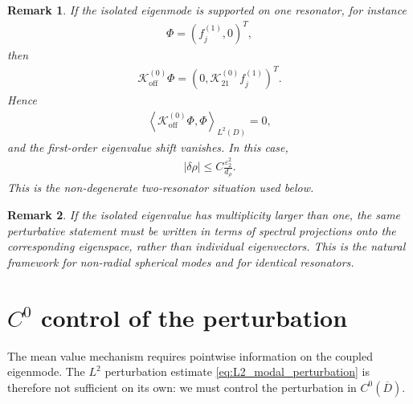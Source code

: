 \documentclass[10pt]{article}
\numberwithin{equation}{section}
\newtheorem*{remark}{Remark}
\begin{document}
\begin{remark}
If the isolated eigenmode is supported on one resonator, for instance
\begin{align*}
    \Phi=(f_j^{(1)},0)^T,
\end{align*}
then
\begin{align*}
    \mathcal K_{\mathrm{off}}^{(0)}\Phi
    =
    (0,\mathcal K_{21}^{(0)}f_j^{(1)})^T.
\end{align*}
Hence
\begin{align*}
    \left\langle
    \mathcal K_{\mathrm{off}}^{(0)}\Phi,\Phi
    \right\rangle_{L^2(D)}
    =
    0,
\end{align*}
and the first-order eigenvalue shift vanishes. In this case,
\begin{align}
    |\delta\rho|
    \leq
    C\frac{\varepsilon_2^2}{d_\rho}.
    \label{eq:quadratic_eigenvalue_shift}
\end{align}
This is the non-degenerate two-resonator situation used below.
\end{remark}

\begin{remark}
If the isolated eigenvalue has multiplicity larger than one, the same perturbative statement must be written in terms of spectral projections onto the corresponding eigenspace, rather than individual eigenvectors. This is the natural framework for non-radial spherical modes and for identical resonators.
\end{remark}











\section{\texorpdfstring{$C^0$}{} control of the perturbation}
\label{sec:C0_control}

The mean value mechanism requires pointwise information on the coupled eigenmode. The $L^2$ perturbation estimate \eqref{eq:L2_modal_perturbation} is therefore not sufficient on its own: we must control the perturbation in $C^0(\overline D)$.
\end{document}
